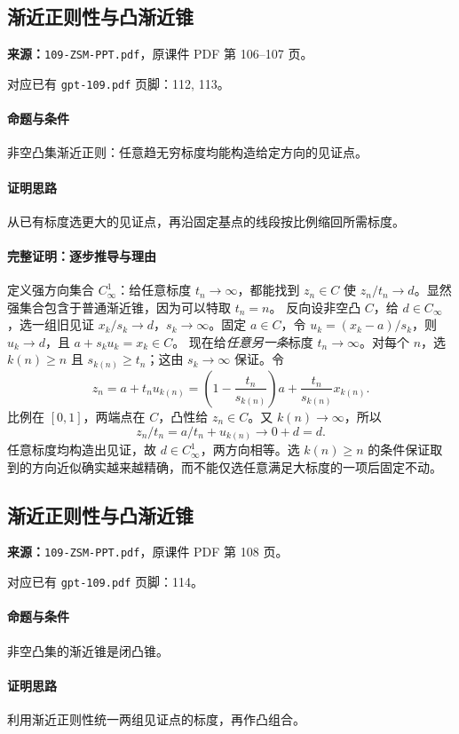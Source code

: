 \clearpage\subsection{渐近正则性与凸渐近锥}
\textbf{来源：}\texttt{109-ZSM-PPT.pdf}，原课件 PDF 第 106--107 页。\par
对应已有 \texttt{gpt-109.pdf} 页脚：112, 113。\par
\paragraph{命题与条件}非空凸集渐近正则：任意趋无穷标度均能构造给定方向的见证点。
\paragraph{证明思路}从已有标度选更大的见证点，再沿固定基点的线段按比例缩回所需标度。
\paragraph{完整证明：逐步推导与理由}

定义强方向集合 $C^1_\infty$：给任意标度 $t_n\to\infty$，都能找到 $z_n\in C$ 使 $z_n/t_n\to d$。显然强集合包含于普通渐近锥，因为可以特取 $t_n=n$。
反向设非空凸 $C$，给 $d\in C_\infty$，选一组旧见证 $x_k/s_k\to d$，$s_k\to\infty$。固定 $a\in C$，令 $u_k=(x_k-a)/s_k$，则 $u_k\to d$，且 $a+s_ku_k=x_k\in C$。
现在给\emph{任意另一条}标度 $t_n\to\infty$。对每个 $n$，选 $k(n)\ge n$ 且 $s_{k(n)}\ge t_n$；这由 $s_k\to\infty$ 保证。令
\[z_n=a+t_nu_{k(n)}=\left(1-\frac{t_n}{s_{k(n)}}\right)a+\frac{t_n}{s_{k(n)}}x_{k(n)}.\]
比例在 $[0,1]$，两端点在 $C$，凸性给 $z_n\in C$。又 $k(n)\to\infty$，所以
\[z_n/t_n=a/t_n+u_{k(n)}\to0+d=d.\]
任意标度均构造出见证，故 $d\in C^1_\infty$，两方向相等。选 $k(n)\ge n$ 的条件保证取到的方向近似确实越来越精确，而不能仅选任意满足大标度的一项后固定不动。

\clearpage\subsection{渐近正则性与凸渐近锥}
\textbf{来源：}\texttt{109-ZSM-PPT.pdf}，原课件 PDF 第 108 页。\par
对应已有 \texttt{gpt-109.pdf} 页脚：114。\par
\paragraph{命题与条件}非空凸集的渐近锥是闭凸锥。
\paragraph{证明思路}利用渐近正则性统一两组见证点的标度，再作凸组合。
